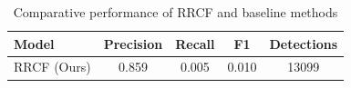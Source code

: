 \begin{table}[htbp]
\centering
\caption{Comparative performance of RRCF and baseline methods}
\label{tab:rq2-model-comparison}
\begin{tabular}{lcccc}
\toprule
Model & Precision & Recall & F1 & Detections \\
\midrule
RRCF (Ours) & 0.859 & 0.005 & 0.010 & 13099 \\
\bottomrule
\end{tabular}
\end{table}